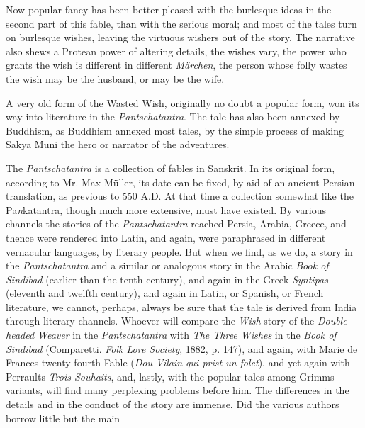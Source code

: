 \documentclass[14pt,a4paper]{memoir}
\begin{document}
{Now popular fancy has been better pleased with the burlesque ideas in
the second part of this fable, than with the serious moral; and most of
the tales turn on burlesque wishes, leaving the virtuous wishers out of
the story. The narrative also shews a Protean power of altering details,
the wishes vary, the power who grants the wish is different in different
\emph{Märchen}, the person whose folly wastes the wish may be the
husband, or may be the wife.

A very old form of the Wasted Wish, originally no doubt a popular form,
won its way into literature in the \emph{Pantschatantra}. The tale has
also been annexed by Buddhism, as Buddhism annexed most tales, by the
simple process of making Sakya Muni the hero or narrator of the
adventures.

The \emph{Pantschatantra} is a collection of fables in Sanskrit. In its
original form, according to Mr. Max Müller, its date can be fixed, by
aid of an ancient Persian translation, as previous to 550 {A.D.}
\textquotesingle At that time a collection somewhat like the
Pa\emph{n}katantra, though much more extensive, must have
existed.\textquotesingle{}
By various channels the stories of the \emph{Pantschatantra} reached
Persia, Arabia, Greece, and thence were rendered into Latin, and again,
were paraphrased in different vernacular languages, by literary people.
But when we find, as we do, a story in the \emph{Pantschatantra} and a
similar or analogous story in the Arabic \emph{Book of Sindibad}
(earlier than the tenth century), and again in the Greek \emph{Syntipas}
(eleventh and twelfth century), and again in Latin, or Spanish, or
French literature, we cannot, perhaps, always be sure that the tale is
derived from India through literary channels. Whoever will compare the
\emph{Wish} story of the \emph{Double-headed Weaver} in the
\emph{Pantschatantra}
with \emph{The Three Wishes} in the \emph{Book of Sindibad} (Comparetti.
\emph{Folk Lore Society}, 1882, p. 147), and again, with Marie de
France\textquotesingle s twenty-fourth Fable (\emph{Dou Vilain qui prist
un folet}), and yet again with Perrault\textquotesingle s \emph{Trois
Souhaits}, and, lastly, with the popular tales among
Grimm\textquotesingle s variants, will find many perplexing problems
before
him.
The differences in the details and in the conduct of the story are
immense. Did the various authors borrow little but the main
}
\end{document}

